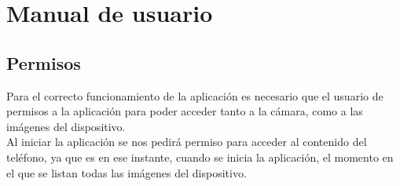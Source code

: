 \chapter{Manual de usuario}
\label{cap:Manual de usuario}

\section{Permisos}

Para el correcto funcionamiento de la aplicación es necesario que el usuario de permisos a la aplicación para poder acceder tanto a la cámara, como a las imágenes del dispositivo.\\

Al iniciar la aplicación se nos pedirá permiso para acceder al contenido del teléfono, ya que es en ese instante, cuando se inicia la aplicación, el momento en el que se listan todas las imágenes del dispositivo.

